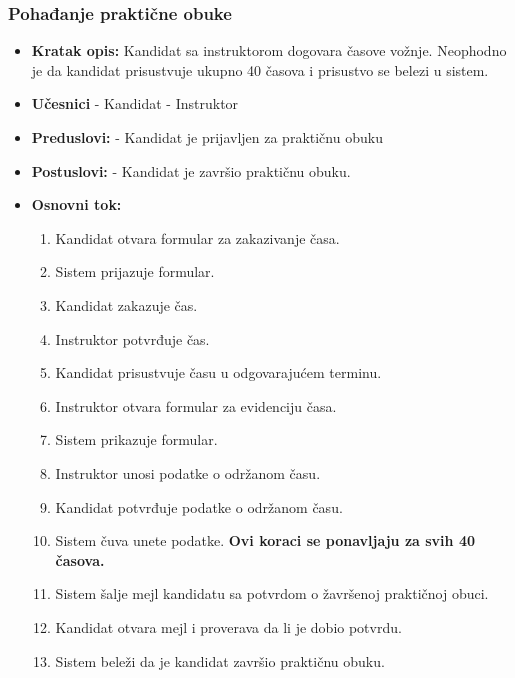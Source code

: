 \subsubsection{Pohađanje praktične obuke}

\vspace{3mm}

\begin{itemize}

\item \textbf{Kratak opis:} Kandidat sa instruktorom dogovara časove vožnje. Neophodno je da kandidat prisustvuje ukupno 40 časova i prisustvo se belezi u sistem.

\vspace{2mm}

\item \textbf{Učesnici} \newline
   - Kandidat \newline   
   - Instruktor 
   
\item \textbf{Preduslovi:} \newline
   - Kandidat je prijavljen za praktičnu obuku 

\item \textbf{Postuslovi:} \newline
    - Kandidat je završio praktičnu obuku.

\item \textbf{Osnovni tok:}  
   \begin{enumerate}
   \item Kandidat otvara formular za zakazivanje časa.
   \item Sistem prijazuje formular.
   \item Kandidat zakazuje čas.
   \item Instruktor potvrđuje čas.
   \item Kandidat prisustvuje času u odgovarajućem terminu.
   \item Instruktor otvara formular za evidenciju časa.
   \item Sistem prikazuje formular.
   \item Instruktor unosi podatke o održanom času.
   \item Kandidat potvrđuje podatke o održanom času.
   \item Sistem čuva unete podatke. \newline
\textbf{Ovi koraci se ponavljaju za svih 40 časova.}
   \item Sistem šalje mejl kandidatu sa potvrdom o žavršenoj praktičnoj obuci.
   \item Kandidat otvara mejl i proverava da li je dobio potvrdu. 
   \item Sistem beleži da je kandidat završio praktičnu obuku.
   \end{enumerate}


\end{itemize}

